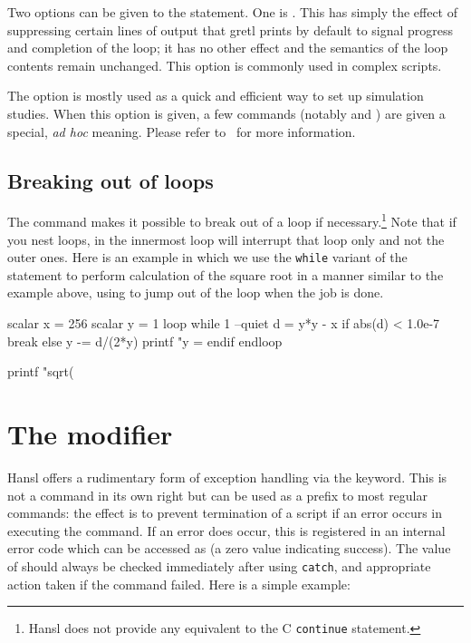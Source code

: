 Two options can be given to the  statement. One is
. This has simply the effect of suppressing certain
lines of output that gretl prints by default to signal progress and
completion of the loop; it has no other effect and the semantics of
the loop contents remain unchanged. This option is commonly used in
complex scripts.

The  option is mostly used as a quick and
efficient way to set up simulation studies. When this option is given,
a few commands (notably  and ) are given a
special, \emph{ad hoc} meaning. Please refer to \GUG\ for more
information.
 
\subsection{Breaking out of loops}
\label{sec:loop-break}

The  command makes it possible to break out of a loop if
necessary.\footnote{Hansl does not provide any equivalent to the C
  \texttt{continue} statement.} Note that if you nest loops,
 in the innermost loop will interrupt that loop only and
not the outer ones.  Here is an example in which we use the
\texttt{while} variant of the  statement to perform
calculation of the square root in a manner similar to the example
above, using  to jump out of the loop when the job is done.
\begin{code}
scalar x = 256
scalar y = 1
loop while 1 --quiet
    d = y*y - x
    if abs(d) < 1.0e-7
        break
    else
        y -= d/(2*y)
        printf "y = %
    endif
endloop

printf "sqrt(%
\end{code}

\section{The  modifier}

Hansl offers a rudimentary form of exception handling via the
 keyword. This is not a command in its own right but can be
used as a prefix to most regular commands: the effect is to prevent
termination of a script if an error occurs in executing the
command. If an error does occur, this is registered in an internal
error code which can be accessed as  (a zero value
indicating success). The value of  should always be
checked immediately after using \texttt{catch}, and appropriate action
taken if the command failed. Here is a simple example:

